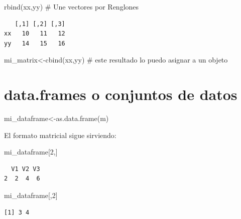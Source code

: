 \documentclass[
  letterpaper,
  DIV=11,
  numbers=noendperiod]{scrreprt}
\newenvironment{Shaded}{\begin{snugshade}}{\end{snugshade}}
\newcommand{\CommentTok}[1]{\textcolor[rgb]{0.37,0.37,0.37}{#1}}
\newcommand{\DecValTok}[1]{\textcolor[rgb]{0.68,0.00,0.00}{#1}}
\newcommand{\FunctionTok}[1]{\textcolor[rgb]{0.28,0.35,0.67}{#1}}
\newcommand{\NormalTok}[1]{\textcolor[rgb]{0.00,0.23,0.31}{#1}}
\newcommand{\OtherTok}[1]{\textcolor[rgb]{0.00,0.23,0.31}{#1}}
\begin{document}
\begin{Shaded}
\begin{Highlighting}[]
\FunctionTok{rbind}\NormalTok{(xx,yy) }\CommentTok{\# Une vectores por Renglones}
\end{Highlighting}
\end{Shaded}

\begin{verbatim}
   [,1] [,2] [,3]
xx   10   11   12
yy   14   15   16
\end{verbatim}

\begin{Shaded}
\begin{Highlighting}[]
\NormalTok{mi\_matrix}\OtherTok{\textless{}{-}}\FunctionTok{cbind}\NormalTok{(xx,yy) }\CommentTok{\# este resultado lo puedo asignar a un objeto}
\end{Highlighting}
\end{Shaded}

\hypertarget{data.frames-o-conjuntos-de-datos}{%
\section{data.frames o conjuntos de
datos}\label{data.frames-o-conjuntos-de-datos}}

\begin{Shaded}
\begin{Highlighting}[]
\NormalTok{mi\_dataframe}\OtherTok{\textless{}{-}}\FunctionTok{as.data.frame}\NormalTok{(m)}
\end{Highlighting}
\end{Shaded}

El formato matricial sigue sirviendo:

\begin{Shaded}
\begin{Highlighting}[]
\NormalTok{mi\_dataframe[}\DecValTok{2}\NormalTok{,]}
\end{Highlighting}
\end{Shaded}

\begin{verbatim}
  V1 V2 V3
2  2  4  6
\end{verbatim}

\begin{Shaded}
\begin{Highlighting}[]
\NormalTok{mi\_dataframe[,}\DecValTok{2}\NormalTok{]}
\end{Highlighting}
\end{Shaded}

\begin{verbatim}
[1] 3 4
\end{verbatim}
\end{document}
